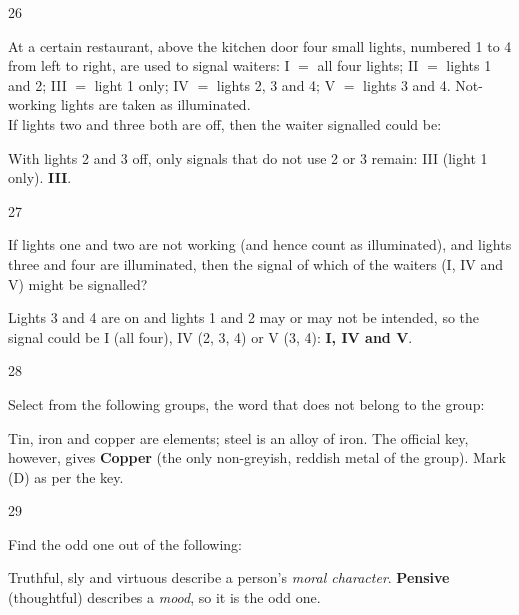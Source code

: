 \begin{question}{26}
{At a certain restaurant, above the kitchen door four small lights, numbered 1 to 4 from left to right, are used to signal waiters: I $=$ all four lights; II $=$ lights 1 and 2; III $=$ light 1 only; IV $=$ lights 2, 3 and 4; V $=$ lights 3 and 4. Not-working lights are taken as illuminated.\\ If lights two and three both are off, then the waiter signalled could be:\par}
\begin{explain}
With lights 2 and 3 off, only signals that do not use 2 or 3 remain: III (light 1 only). \textbf{III}.
\end{explain}
\end{question}

\begin{question}{27}
{If lights one and two are not working (and hence count as illuminated), and lights three and four are illuminated, then the signal of which of the waiters (I, IV and V) might be signalled?\par}
\begin{explain}
Lights 3 and 4 are on and lights 1 and 2 may or may not be intended, so the signal could be I (all four), IV (2, 3, 4) or V (3, 4): \textbf{I, IV and V}.
\end{explain}
\end{question}

\begin{question}{28}
{Select from the following groups, the word that does not belong to the group:\par}
\begin{explain}
Tin, iron and copper are elements; steel is an alloy of iron. The official key, however, gives \textbf{Copper} (the only non-greyish, reddish metal of the group). Mark (D) as per the key.
\end{explain}
\end{question}

\begin{question}{29}
{Find the odd one out of the following:\par}
\begin{explain}
Truthful, sly and virtuous describe a person's \emph{moral character}. \textbf{Pensive} (thoughtful) describes a \emph{mood}, so it is the odd one.
\end{explain}
\end{question}

